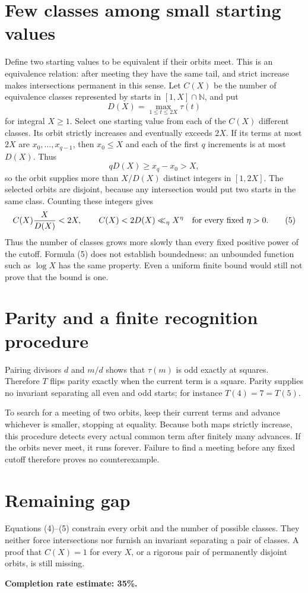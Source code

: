 \documentclass[11pt]{article}
\begin{document}
\section*{Few classes among small starting values}
Define two starting values to be equivalent if their orbits meet. This is an equivalence relation: after meeting they have the same tail, and strict increase makes intersections permanent in this sense. Let $C(X)$ be the number of equivalence classes represented by starts in $[1,X]\cap\mathbb N$, and put
\[
 D(X)=\max_{1\le t\le2X}\tau(t)
\]
for integral $X\ge1$. Select one starting value from each of the $C(X)$ different classes. Its orbit strictly increases and eventually exceeds $2X$. If its terms at most $2X$ are $x_0,\ldots,x_{q-1}$, then $x_0\le X$ and each of the first $q$ increments is at most $D(X)$. Thus
\[
 qD(X)\ge x_q-x_0>X,
\]
so the orbit supplies more than $X/D(X)$ distinct integers in $[1,2X]$. The selected orbits are disjoint, because any intersection would put two starts in the same class. Counting these integers gives
\[
 C(X)\frac{X}{D(X)}<2X,
 \qquad C(X)<2D(X)\ll_\eta X^\eta
 \quad\hbox{for every fixed }\eta>0. \tag{5}
\]
Thus the number of classes grows more slowly than every fixed positive power of the cutoff. Formula (5) does not establish boundedness: an unbounded function such as $\log X$ has the same property. Even a uniform finite bound would still not prove that the bound is one.

\section*{Parity and a finite recognition procedure}
Pairing divisors $d$ and $m/d$ shows that $\tau(m)$ is odd exactly at squares. Therefore $T$ flips parity exactly when the current term is a square. Parity supplies no invariant separating all even and odd starts; for instance $T(4)=7=T(5)$.

To search for a meeting of two orbits, keep their current terms and advance whichever is smaller, stopping at equality. Because both maps strictly increase, this procedure detects every actual common term after finitely many advances. If the orbits never meet, it runs forever. Failure to find a meeting before any fixed cutoff therefore proves no counterexample.

\section*{Remaining gap}
Equations (4)--(5) constrain every orbit and the number of possible classes. They neither force intersections nor furnish an invariant separating a pair of classes. A proof that $C(X)=1$ for every $X$, or a rigorous pair of permanently disjoint orbits, is still missing.

\textbf{Completion rate estimate: 35\%.}
\end{document}
